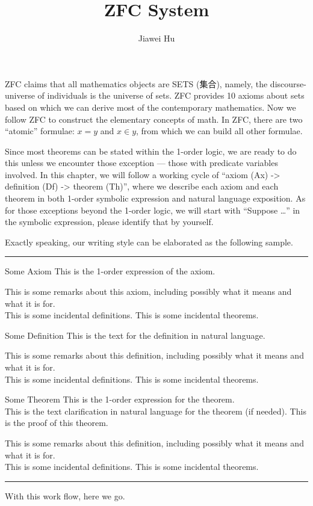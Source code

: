 \documentclass{article}
\title{\LARGE ZFC System}
\author{\large Jiawei Hu}
\begin{document}
\maketitle

ZFC claims that all mathematics objects are SETS (集合), namely, the discourse-universe of individuals is the universe of sets. ZFC provides 10 axioms about sets based on which we can derive most of the contemporary mathematics. Now we follow ZFC to construct the elementary concepts of math.
In ZFC, there are two ``atomic'' formulae: $x=y$ and $x\in y$, from which we can build all other formulae.

Since most theorems can be stated within the 1-order logic, we are ready to do this unless we encounter those exception — those with predicate variables involved. In this chapter, we will follow a working cycle of ``axiom (Ax) -> definition (Df) -> theorem (Th)'', where we describe each axiom and each theorem in both 1-order symbolic expression and natural language exposition. As for those exceptions beyond the 1-order logic, we will start with ``Suppose \dots'' in the symbolic expression, please identify that by yourself.

Exactly speaking, our writing style can be elaborated as the following sample.\\
\noindent\rule{\textwidth}{1pt}
\begin{Ax}{Some Axiom}
    \textcolor{Ax}{This is the 1-order expression of the axiom.}
\end{Ax}
This is some remarks about this axiom, including possibly what it means and what it is for.\\
\textcolor{Df}{This is some incidental definitions.}
\textcolor{Th}{This is some incidental theorems.}

\begin{Df}{Some Definition}
    This is the text for the definition in natural language.
\end{Df}
This is some remarks about this definition, including possibly what it means and what it is for.\\
\textcolor{Df}{This is some incidental definitions.}
\textcolor{Th}{This is some incidental theorems.}

\begin{Th}{Some Theorem}
    \textcolor{Th}{This is the 1-order expression for the theorem.}\\
    This is the text clarification in natural language for the theorem (if needed).
    \tcblower
    This is the proof of this theorem.
\end{Th}
This is some remarks about this definition, including possibly what it means and what it is for.\\
\textcolor{Df}{This is some incidental definitions.}
\textcolor{Th}{This is some incidental theorems.}\\
\noindent\rule{\textwidth}{1pt}
With this work flow, here we go.
\end{document}
